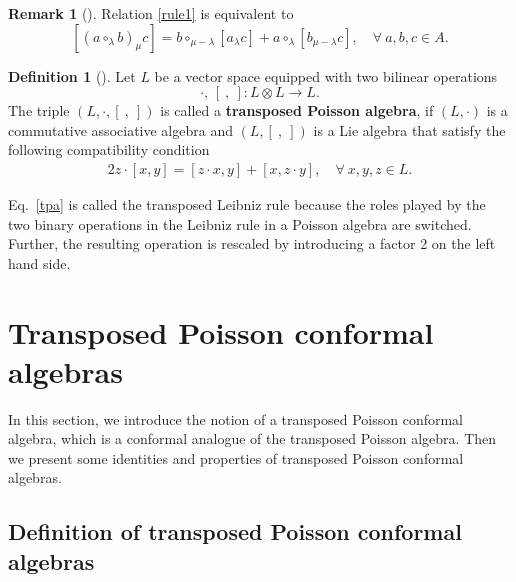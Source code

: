\documentclass[11pt,letterpaper,reqno]{amsart}
\theoremstyle{definition}
\newtheorem{definition}[theorem]{Definition}
\newtheorem{remark}[theorem]{Remark}
\numberwithin{equation}{section}
\begin{document}
\begin{remark}[{\cite{Kol20}}]
Relation \eqref{rule1} is equivalent to
   \begin{equation}\label{rule6}
      [(a \circ_\lambda b)_\mu c] = b \circ_{\mu - \lambda} [a _\lambda c] + a \circ_\lambda [b _{\mu - \lambda} c],\quad\forall~ a,b,c\in A.
   \end{equation}
\end{remark}


\begin{definition}[{\cite{Bai23}}]
Let $L$ be a vector space equipped with two bilinear operations
$$\cdot,\,[~,~ ] : L \otimes  L \rightarrow L.$$
The triple $ (L, \cdot, [~ , ~])$ is called a \textbf{transposed Poisson algebra}, if $ (L, \cdot)$ is a commutative associative algebra and $(L, [~,~])$ is a Lie algebra that satisfy the following compatibility condition
\begin{align}\label{tpa}
	2z \cdot [x, y] = [z \cdot x, y] + [x, z \cdot y], \quad\forall ~ x, y, z \in L.
\end{align}
\end{definition}
Eq.~\eqref{tpa} is called the transposed Leibniz rule because the roles played by the two binary operations in the Leibniz rule in a Poisson algebra are switched. Further, the resulting operation is rescaled by introducing a factor 2 on the left hand side.









\section{Transposed Poisson conformal algebras}\label{sec3}


In this section, we introduce the notion of a transposed Poisson conformal algebra, which is a conformal analogue of the transposed Poisson algebra. Then we present some identities and properties of transposed Poisson conformal algebras.

\subsection{Definition of transposed Poisson conformal algebras}
\end{document}
